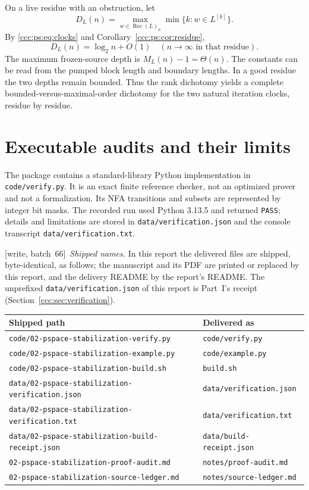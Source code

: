 \documentclass[11pt,letterpaper]{article}
\theoremstyle{definition}
\theoremstyle{remark}
\newcommand{\rec}{\operatorname{Rec}}
\newcommand{\gen}[2]{#1^{[#2]}}
\newcommand{\wsix}{\textup{[write, batch~66]}}
\begin{document}
On a live residue with an obstruction, let
\[
 D_L(n)=\max_{w\in\rec(L)_n}\min\{k:w\in\gen Lk\}.
\]
By \eqref{ccc:ps:eq:clocks} and Corollary~\ref{ccc:ps:cor:residue},
\begin{equation}\label{ccc:ps:eq:depth-asymptotic}
 D_L(n)=\log_2 n+O(1)
 \quad(n\to\infty\text{ in that residue}).
\end{equation}
The maximum frozen-source depth is $M_L(n)-1=\Theta(n)$. The constants
can be read from the pumped block length and boundary lengths. In a good
residue the two depths remain bounded. Thus the rank dichotomy yields a
complete bounded-versus-maximal-order dichotomy for the two natural
iteration clocks, residue by residue.

\section{Executable audits and their limits}\label{ccc:ps:sec:audits}

The package contains a standard-library Python implementation in
\nolinkurl{code/verify.py}. It is an exact finite reference checker, not
an optimized prover and not a formalization. Its NFA transitions and
subsets are represented by integer bit masks. The recorded run used
Python 3.13.5 and returned \texttt{PASS}; details and limitations are
stored in \nolinkurl{data/verification.json} and the console transcript
\nolinkurl{data/verification.txt}.

\wsix\ \emph{Shipped names.} In this report the delivered files are shipped,
byte-identical, as follows; the manuscript and its PDF are printed or
replaced by this report, and the delivery README by the report's README. The
unprefixed \nolinkurl{data/verification.json} of this report is Part~I's
receipt (Section~\ref{ccc:sec:verification}).
\begin{center}\footnotesize
\begin{tabular}{@{}L{.58\textwidth}L{.36\textwidth}@{}}
\toprule
\textbf{Shipped path} & \textbf{Delivered as}\\
\midrule
\nolinkurl{code/02-pspace-stabilization-verify.py} & \texttt{code/verify.py}\\
\nolinkurl{code/02-pspace-stabilization-example.py} & \texttt{code/example.py}\\
\nolinkurl{code/02-pspace-stabilization-build.sh} & \texttt{build.sh}\\
\nolinkurl{data/02-pspace-stabilization-verification.json} & \texttt{data/verification.json}\\
\nolinkurl{data/02-pspace-stabilization-verification.txt} & \texttt{data/verification.txt}\\
\nolinkurl{data/02-pspace-stabilization-build-receipt.json} & \texttt{data/build-receipt.json}\\
\nolinkurl{02-pspace-stabilization-proof-audit.md} & \texttt{notes/proof-audit.md}\\
\nolinkurl{02-pspace-stabilization-source-ledger.md} & \texttt{notes/source-ledger.md}\\
\bottomrule
\end{tabular}
\end{center}
\end{document}
